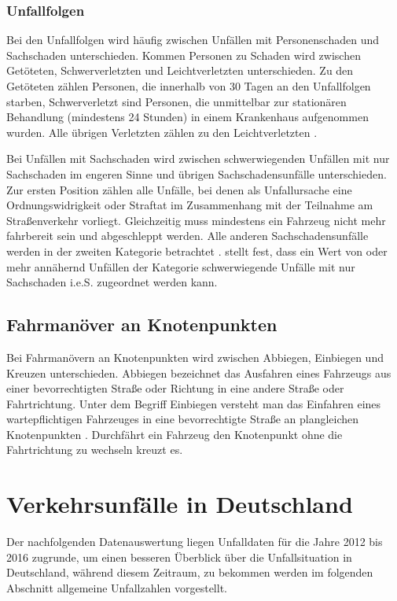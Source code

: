 \subsubsection{Unfallfolgen}\label{subsection:Unfallfolgen}
Bei den Unfallfolgen wird häufig zwischen Unfällen mit Personenschaden und Sachschaden unterschieden. Kommen Personen zu Schaden wird zwischen Getöteten, Schwerverletzten und Leichtverletzten unterschieden. Zu den Getöteten zählen Personen, die innerhalb von 30 Tagen an den Unfallfolgen starben, Schwerverletzt sind Personen, die unmittelbar zur stationären Behandlung (mindestens 24 Stunden) in einem Krankenhaus aufgenommen wurden. Alle übrigen Verletzten zählen zu den Leichtverletzten \parencite[S. 12]{StatistischesBundesamt.2018b}.

Bei Unfällen mit Sachschaden wird zwischen schwerwiegenden Unfällen mit nur Sachschaden im engeren Sinne und übrigen Sachschadensunfälle unterschieden. Zur ersten Position zählen alle Unfälle, bei denen als Unfallursache eine Ordnungswidrigkeit oder Straftat im Zusammenhang mit der Teilnahme am Straßenverkehr vorliegt. Gleichzeitig muss mindestens ein Fahrzeug nicht mehr fahrbereit sein und abgeschleppt werden. Alle anderen Sachschadensunfälle werden in der zweiten Kategorie betrachtet \parencite[S. 12]{StatistischesBundesamt.2018b}. \Textcite[S. 23]{Vollrath.2006} stellt fest, dass ein Wert von  oder mehr annähernd Unfällen der Kategorie schwerwiegende Unfälle mit nur Sachschaden i.e.S. zugeordnet werden kann.

\subsection{Fahrmanöver an Knotenpunkten}
Bei Fahrmanövern an Knotenpunkten wird zwischen Abbiegen, Einbiegen und Kreuzen unterschieden. Abbiegen bezeichnet das Ausfahren eines Fahrzeugs aus einer bevorrechtigten Straße oder Richtung in eine andere Straße oder Fahrtrichtung. Unter dem Begriff Einbiegen versteht man das Einfahren eines wartepflichtigen Fahrzeuges in eine bevorrechtigte Straße an plangleichen Knotenpunkten \parencite[S. 90f]{ForschungsgesellschaftfurStraenundVerkehrswesen.2012b}. Durchfährt ein Fahrzeug den Knotenpunkt ohne die Fahrtrichtung zu wechseln kreuzt es.

\section{Verkehrsunfälle in Deutschland}\label{chapter:Verkehrsunfälle in Deutschland}
Der nachfolgenden Datenauswertung liegen Unfalldaten für die Jahre 2012 bis 2016 zugrunde, um einen besseren Überblick über die Unfallsituation in Deutschland, während diesem Zeitraum, zu bekommen werden im folgenden Abschnitt allgemeine Unfallzahlen vorgestellt.


